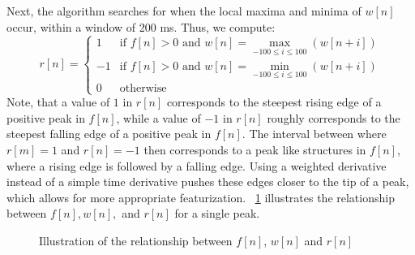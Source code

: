 \documentclass[conference]{IEEEtran}
\begin{document}
Next, the algorithm searches for when the local
maxima and minima of $w[n]$ occur, within a window of
200 ms. Thus, we compute:
\begin{equation*}
	r[n] = \left \{
		\begin{array}{lc}
			1 & \text{if } f[n]>0 \text{ and } w[n] = \max\limits_{-100 \le i \le 100} (w[n+i]) \\
			-1 & \text{if } f[n]>0 \text{ and }  w[n] = \min\limits_{-100 \le i \le 100} (w[n+i]) \\
			0 & \text{otherwise}
		\end{array}
	\right.
\end{equation*}
Note, that a value of $1$ in $r[n]$ corresponds to the
steepest rising edge of a positive peak in $f[n]$, while a value of $-1$
in $r[n]$ roughly corresponds to the steepest falling edge of a positive peak
in $f[n]$. 
The interval between where $r[m]=1$ and $r[n]=-1$ then corresponds to a 
peak like structures in $f[n]$, where a rising edge is followed by a falling edge.
Using a weighted derivative instead of a simple time derivative pushes these edges closer to the tip of a peak, which allows for more appropriate featurization.
\figurename~\ref{fig:fwr} illustrates the relationship between $f[n], w[n], $ and $r[n]$ for a single peak.
\begin{figure}
	\centering
	\caption{
	Illustration of the relationship between $f[n]$, $w[n]$ and $r[n]$}
	\label{fig:fwr}
\end{figure}
\end{document}
